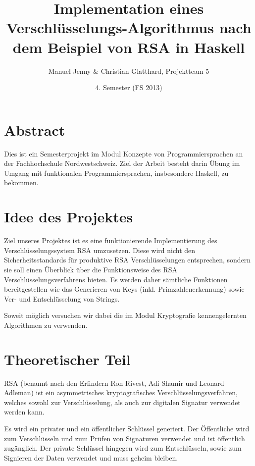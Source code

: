 \documentclass[a4paper, 11pt]{article} %
\title{Implementation eines Verschlüsselungs-Algorithmus nach dem Beispiel von RSA in Haskell}
\author{Manuel Jenny \& Christian Glatthard, Projektteam 5}
\date{4. Semester (FS 2013)}
\begin{document}
\maketitle
\thispagestyle{fancy}

\newpage

\tableofcontents	  	


\newpage
\setcounter{page}{1}


\section{Abstract}
Dies ist ein Semesterprojekt im Modul Konzepte von Programmiersprachen an der Fachhochschule Nordwestschweiz. Ziel der Arbeit besteht darin Übung im Umgang mit funktionalen Programmiersprachen, insbesondere Haskell, zu bekommen.

\section{Idee des Projektes}
Ziel unseres Projektes ist es eine funktionierende Implementierung des Verschlüsselungssystem RSA umzusetzen. Diese wird nicht den Sicherheitsstandards für produktive RSA Verschlüsselungen entsprechen, sondern sie soll einen Überblick über die Funktionsweise des RSA Verschlüsselungsverfahrens bieten. Es werden daher sämtliche Funktionen bereitgestellen wie das Generieren von Keys (inkl. Primzahlenerkennung) sowie Ver- und Entschlüsselung von Strings.

Soweit möglich versuchen wir dabei die im Modul Kryptografie kennengelernten Algorithmen zu verwenden.

\section{Theoretischer Teil}
RSA (benannt nach den Erfindern Ron Rivest, Adi Shamir und Leonard Adleman) ist ein asymmetrisches kryptografisches Verschlüsselungsverfahren, welches sowohl zur Verschlüsselung, als auch zur digitalen Signatur verwendet werden kann.

Es wird ein privater und ein öffentlicher Schlüssel generiert. Der Öffentliche wird zum Verschlüsseln und zum Prüfen von Signaturen verwendet und ist öffentlich zugänglich. Der private Schlüssel hingegen wird zum Entschlüsseln, sowie zum Signieren der Daten verwendet und muss geheim bleiben.
\end{document}
